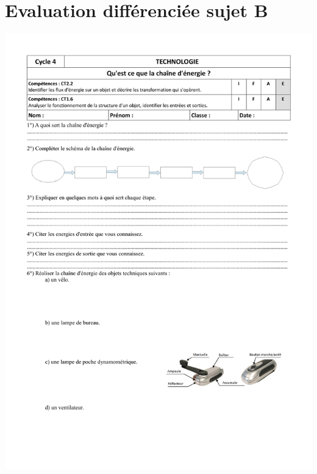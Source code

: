 \section{Evaluation différenciée sujet B}\label{annexe:evaluation_chaine_energie_B}
\includegraphics[scale=0.6]{./ressources/Controle_chaine_energie_B.pdf} 

